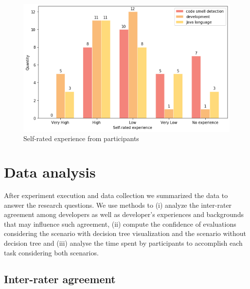 \begin{figure}[t]
\centering
\includegraphics[scale=0.65]{figures/Self-rated_experience.png}
\caption{Self-rated experience from participants}
\label{fig:sefRatedExperience}
\end{figure}

\section{Data analysis}

After experiment execution and data collection we summarized the data to answer the research questions. We use methods to (i) analyze the inter-rater agreement among developers as well as developer's experiences and backgrounds that may influence such agreement, (ii) compute the confidence of evaluations considering the scenario with decision tree visualization and the scenario without decision tree and (iii) analyse the time spent by participants to accomplish each task considering both scenarios.

\subsection{Inter-rater agreement}


